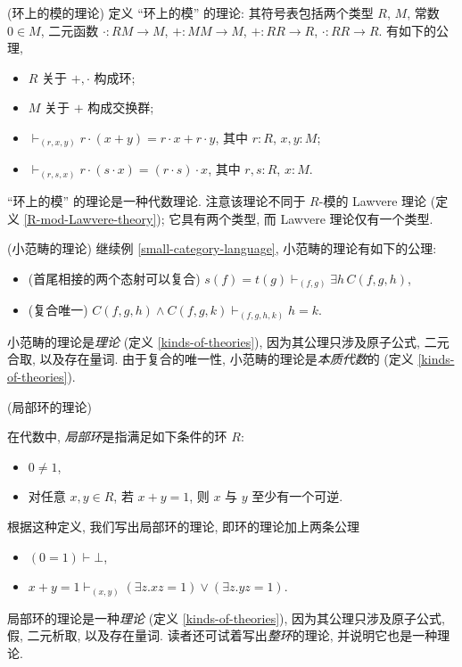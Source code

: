 \begin{example}
    {(环上的模的理论)}
    定义 ``环上的模'' 的理论:
    其符号表包括两个类型 $R$, $M$, 常数 $0\in M$, 二元函数 $\cdot\colon RM \to M$, $+\colon MM\to M$, $+\colon RR\to R$, $\cdot\colon RR\to R$.
    有如下的公理,
    \begin{itemize}
    	\item $R$ 关于 $+,\cdot$ 构成环;
    	\item $M$ 关于 $+$ 构成交换群;
    	\item $\vdash_{(r,x,y)} r\cdot (x+y) = r\cdot x+r\cdot y$, 其中 $r\colon R$, $x,y\colon M$;
    	\item $\vdash_{(r,s,x)} r\cdot (s\cdot x) = (r\cdot s)\cdot x$, 其中 $r,s\colon R$, $x\colon M$.
    \end{itemize}
	``环上的模'' 的理论是一种代数理论. 注意该理论不同于 $R$-模的 Lawvere 理论 (定义 \ref{R-mod-Lawvere-theory}); 它具有两个类型, 而 Lawvere 理论仅有一个类型.
\end{example}

\begin{example}
	[label={small-category-theory}]
	{(小范畴的理论)}
	继续例 \ref{small-category-language}, 小范畴的理论有如下的公理:
	\begin{itemize}
		\item (首尾相接的两个态射可以复合) $s(f)=t(g)\vdash_{(f,g)}\exists h\, C(f,g,h)$,
		\item (复合唯一)
		$C(f,g,h)\land C(f,g,k) \vdash_{(f,g,h,k)} h=k$.
	\end{itemize}
	小范畴的理论是\emph{\regular{}理论} (定义 \ref{kinds-of-theories}), 因为其公理只涉及原子公式, 二元合取, 以及存在量词.
	由于复合的唯一性, 小范畴的理论是\emph{本质代数}的 (定义 \ref{kinds-of-theories}).
\end{example}

\begin{example}
	{(局部环的理论)}
	
	在代数中, \emph{局部环}\footnotemark{}是指满足如下条件的环 $R$:
	\begin{itemize}
		\item $0\neq 1$,
		\item 对任意 $x,y\in R$, 若 $x+y=1$, 则 $x$ 与 $y$ 至少有一个可逆.
	\end{itemize}
	根据这种定义, 我们写出局部环的理论, 即环的理论加上两条公理
	\begin{itemize}
		\item $(0=1)\vdash \bot$,
		\item $x+y=1\vdash_{(x,y)} (\exists z. xz=1)\vee (\exists z. yz=1)$.
	\end{itemize}
	局部环的理论是一种\emph{\coherent{}理论} (定义 \ref{kinds-of-theories}), 因为其公理只涉及原子公式, 假, 二元析取, 以及存在量词.
	读者还可试着写出\emph{整环}的理论, 并说明它也是一种\coherent{}理论.
\end{example}

